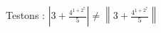 \documentclass[a4paper,10pt]{article}
\providecommand{\abs}[1]{\left| #1 \right|}
\providecommand{\norm}[1]{\left\| #1 \right\|}
\begin{document}
Testons : $ \abs{3 + \frac{4^{1+2^7}}{5}} \neq \norm{3 + \frac{4^{1+2^7}}{5}} $
\end{document}
